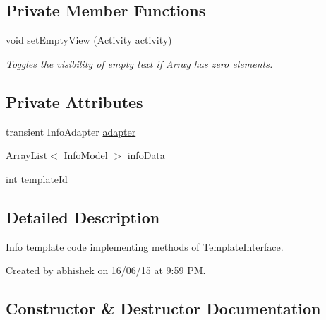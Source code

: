 \subsection*{Private Member Functions}
\begin{DoxyCompactItemize}
\item 
void \hyperlink{classorg_1_1buildmlearn_1_1toolkit_1_1templates_1_1InfoTemplate_a02a228f917ea60f871b1456a0c4d6ac8}{set\+Empty\+View} (Activity activity)
\begin{DoxyCompactList}\small\item\em Toggles the visibility of empty text if Array has zero elements. \end{DoxyCompactList}\end{DoxyCompactItemize}
\subsection*{Private Attributes}
\begin{DoxyCompactItemize}
\item 
transient Info\+Adapter \hyperlink{classorg_1_1buildmlearn_1_1toolkit_1_1templates_1_1InfoTemplate_a96071b9339793a158f1de56111267ea3}{adapter}
\item 
Array\+List$<$ \hyperlink{classorg_1_1buildmlearn_1_1toolkit_1_1templates_1_1InfoModel}{Info\+Model} $>$ \hyperlink{classorg_1_1buildmlearn_1_1toolkit_1_1templates_1_1InfoTemplate_ad71b7f973a4cf7ffbb49f4443d15ee64}{info\+Data}
\item 
int \hyperlink{classorg_1_1buildmlearn_1_1toolkit_1_1templates_1_1InfoTemplate_a8aa87de71f3a80c02636551351a890cd}{template\+Id}
\end{DoxyCompactItemize}


\subsection{Detailed Description}
Info template code implementing methods of Template\+Interface. 

Created by abhishek on 16/06/15 at 9\+:59 PM. 

\subsection{Constructor \& Destructor Documentation}
